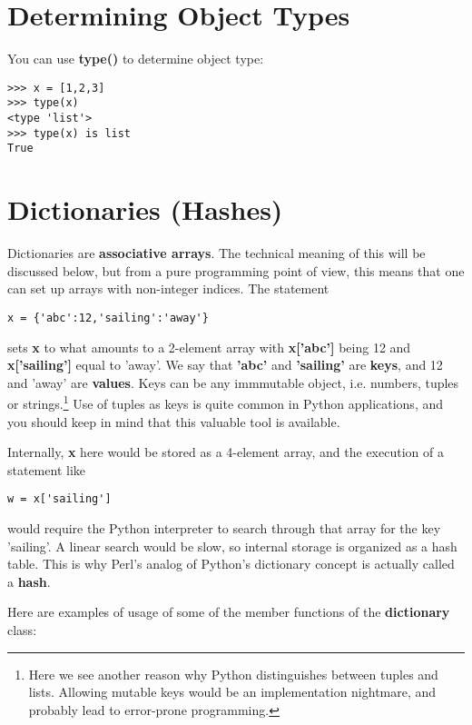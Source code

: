\section{Determining Object Types}

You can use {\bf type()} to determine object type:

\begin{lstlisting}
>>> x = [1,2,3]
>>> type(x)
<type 'list'>
>>> type(x) is list
True
\end{lstlisting}

\section{Dictionaries (Hashes)}
\label{hashes}

Dictionaries are {\bf associative arrays}.  The technical meaning of
this will be discussed below, but from a pure programming point of view,
this means that one can set up arrays with non-integer indices.  The
statement

\begin{Verbatim}[fontsize=\relsize{-2}]
x = {'abc':12,'sailing':'away'}
\end{Verbatim}

sets {\bf x} to what amounts to a 2-element array with {\bf x['abc']}
being 12 and {\bf x['sailing']} equal to 'away'.  We say that {\bf
'abc'} and {\bf 'sailing'} are {\bf keys}, and 12 and 'away' are {\bf
values}.  Keys can be any immmutable object, i.e. numbers, tuples or
strings.\footnote{Here we see another reason why Python distinguishes between
tuples and lists.  Allowing mutable keys would be an implementation
nightmare, and probably lead to error-prone programming.}  Use of tuples
as keys is quite common in Python applications, and you should keep in
mind that this valuable tool is available.

Internally, {\bf x} here would be stored as a 4-element array, and the
execution of a statement like

\begin{Verbatim}[fontsize=\relsize{-2}]
w = x['sailing']
\end{Verbatim}

would require the Python interpreter to search through that array for
the key 'sailing'.  A linear search would be slow, so internal storage
is organized as a hash table.  This is why Perl's analog of Python's
dictionary concept is actually called a {\bf hash}.

Here are examples of usage of some of the member functions of the {\bf
dictionary} class:

